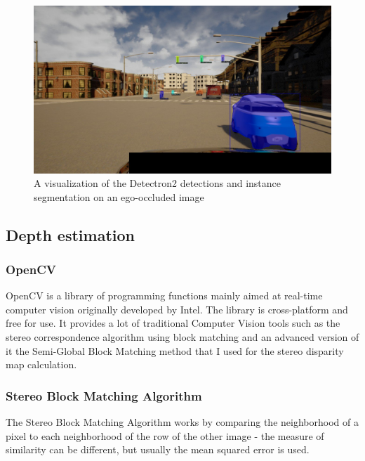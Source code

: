\begin{figure}[!ht]
    \centering
    \includegraphics[width=150mm, keepaspectratio]{figures/335DET.jpg}
    \caption{A visualization of the Detectron2 detections and instance segmentation on an ego-occluded image}
    \label{fig:detection}
\end{figure}

\subsection{Depth estimation}
\subsubsection{OpenCV}
OpenCV is a library of programming functions mainly aimed at real-time computer
vision originally developed by Intel. The library is cross-platform and free for
use. It provides a lot of traditional Computer Vision tools such as the stereo
correspondence algorithm using block matching \cite{5489515} and an advanced
version of it the Semi-Global Block Matching method \cite{4359315} that I used
for the stereo disparity map calculation.
\subsubsection{Stereo Block Matching Algorithm}
The Stereo Block Matching Algorithm works by comparing the neighborhood of a pixel
to each neighborhood of the row of the other image - the measure of similarity
can be different, but usually the mean squared error is used.


